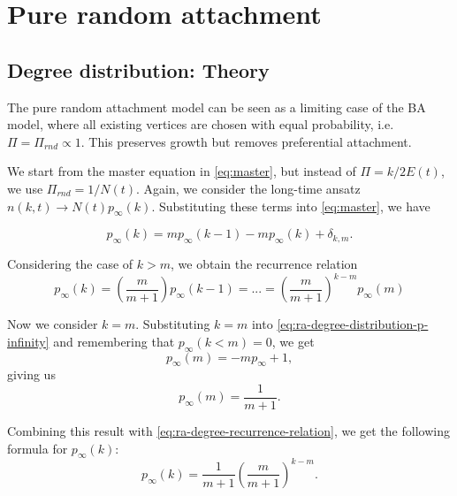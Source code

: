 \section{Pure random attachment}\label{section:pure-random-attachment}

\subsection{Degree distribution: Theory}
The pure random attachment model can be seen as a limiting case of the BA model, where all existing vertices are chosen with equal probability, i.e. $\Pi = \Pi_{rnd} \propto 1$. This preserves growth but removes preferential attachment. 

We start from the master equation in \autoref{eq:master}, but instead of $\Pi = k/ 2E(t)$, we use $\Pi_{rnd} = 1 / N(t)$. Again, we consider the long-time ansatz $n(k, t) \rightarrow N(t) p_{\infty}(k)$. Substituting these terms into \autoref{eq:master}, we have

\begin{equation}
	p_{\infty}(k) = m p_{\infty}(k-1) - m p_{\infty}(k) + \delta_{k, m}. 
	\label{eq:ra-degree-distribution-p-infinity}
\end{equation}

Considering the case of $k > m$, we obtain the recurrence relation
\begin{equation}
	p_{\infty}(k) = \left ( \frac{m}{m+1} \right ) p_{\infty}(k-1)=...= \left ( \frac{m}{m+1} \right )^{k-m} p_{\infty}(m)
	\label{eq:ra-degree-recurrence-relation}
\end{equation}

Now we consider $k=m$. Substituting $k=m$ into \autoref{eq:ra-degree-distribution-p-infinity} and remembering that $p_{\infty}(k < m) = 0$, we get
\begin{equation}
	p_{\infty}(m) = -mp_{\infty} + 1, 
	\label{eq:ra-degree-k-equal-m}
\end{equation}
giving us 
\begin{equation}
	p_{\infty}(m) = \frac{1}{m+1}. 
	\label{eq:ra-degree-p-infinity-m}
\end{equation}

Combining this result with \autoref{eq:ra-degree-recurrence-relation}, we get the following formula for $p_{\infty}(k)$:
\begin{equation}
	p_{\infty}(k) = \frac{1}{m+1} \left ( \frac{m}{m+1}\right )^{k-m}.
	\label{eq:p-infinity-solution-ra}
\end{equation}

